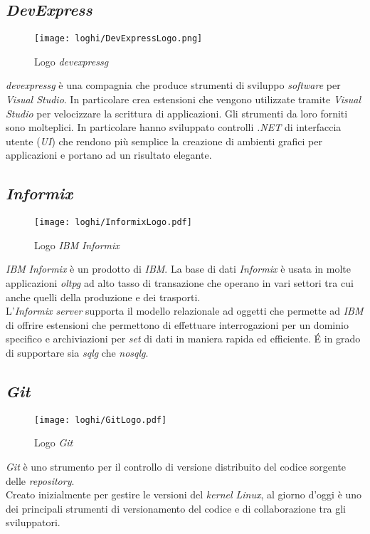 \subsection*{\textit{DevExpress}}
\begin{figure}[!h] 
    \centering 
    \texttt{[image: loghi/DevExpressLogo.png]}
    \caption{Logo \textit{\gls{devexpressg}}}
\end{figure}
\noindent \textit{\gls{devexpressg}} è una compagnia che produce strumenti di sviluppo \textit{software} per
\textit{Visual Studio}. In particolare crea estensioni che vengono utilizzate tramite \textit{Visual Studio}
per velocizzare la scrittura di applicazioni. Gli strumenti da loro forniti sono
molteplici. In particolare hanno sviluppato controlli \textit{.NET} di interfaccia utente (\textit{UI}) che
rendono più semplice la creazione di ambienti grafici per applicazioni e portano ad un risultato
elegante.

\subsection*{\textit{Informix}}
\begin{figure}[!h] 
    \centering 
    \texttt{[image: loghi/InformixLogo.pdf]}
    \caption{Logo \textit{IBM} \textit{Informix}}
\end{figure}
\noindent \textit{IBM} \textit{Informix} è un prodotto di \textit{IBM}. La base di dati \textit{Informix} è usata in molte
applicazioni \textit{\gls{oltpg}} ad alto tasso di transazione che operano in vari settori tra cui anche quelli della produzione e dei trasporti.\\
L’\textit{Informix server} supporta il modello relazionale ad oggetti che permette ad \textit{IBM} di
offrire estensioni che permettono di effettuare interrogazioni per un dominio specifico
e archiviazioni per \textit{set} di dati in maniera rapida ed efficiente.
É in grado di supportare sia \textit{\gls{sqlg}} che \textit{\gls{nosqlg}}.

\subsection*{\textit{Git}}
\label{sec:git}
\begin{figure}[!h] 
    \centering 
    \texttt{[image: loghi/GitLogo.pdf]}
    \caption{Logo \textit{Git}}
\end{figure}
\noindent \textit{Git} è uno strumento per il controllo di versione distribuito del codice sorgente delle \textit{repository}.\\
Creato inizialmente per gestire le versioni del \textit{kernel Linux}, al giorno d'oggi è uno dei principali
strumenti di versionamento del codice e di collaborazione tra gli sviluppatori.
